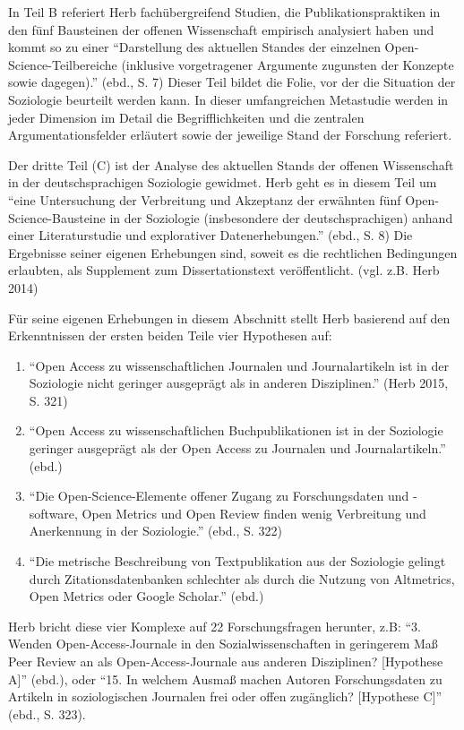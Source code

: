 \documentclass[a4paper,
fontsize=11pt,
oneside,
numbers=noperiodatend,
parskip=half-,
bibliography=totoc,
final
]{scrartcl}
\begin{document}
In Teil B referiert Herb fachübergreifend Studien, die
Publikationspraktiken in den fünf Bausteinen der offenen Wissenschaft
empirisch analysiert haben und kommt so zu einer \enquote{Darstellung
des aktuellen Standes der einzelnen Open-Science-Teilbereiche (inklusive
vorgetragener Argumente zugunsten der Konzepte sowie dagegen).} (ebd.,
S. 7) Dieser Teil bildet die Folie, vor der die Situation der Soziologie
beurteilt werden kann. In dieser umfangreichen Metastudie werden in
jeder Dimension im Detail die Begrifflichkeiten und die zentralen
Argumentationsfelder erläutert sowie der jeweilige Stand der Forschung
referiert.

Der dritte Teil (C) ist der Analyse des aktuellen Stands der offenen
Wissenschaft in der deutschsprachigen Soziologie gewidmet. Herb geht es
in diesem Teil um \enquote{eine Untersuchung der Verbreitung und
Akzeptanz der erwähnten fünf Open-Science-Bausteine in der Soziologie
(insbesondere der deutschsprachigen) anhand einer Literaturstudie und
explorativer Datenerhebungen.} (ebd., S. 8) Die Ergebnisse seiner
eigenen Erhebungen sind, soweit es die rechtlichen Bedingungen
erlaubten, als Supplement zum Dissertationstext veröffentlicht. (vgl.
z.B. Herb 2014)

Für seine eigenen Erhebungen in diesem Abschnitt stellt Herb basierend
auf den Erkenntnissen der ersten beiden Teile vier Hypothesen auf:

\begin{enumerate}
\def\labelenumi{\Alph{enumi}.}
\item
  \enquote{Open Access zu wissenschaftlichen Journalen und
  Journalartikeln ist in der Soziologie nicht geringer ausgeprägt als in
  anderen Disziplinen.} (Herb 2015, S. 321)
\item
  \enquote{Open Access zu wissenschaftlichen Buchpublikationen ist in
  der Soziologie geringer ausgeprägt als der Open Access zu Journalen
  und Journalartikeln.} (ebd.)
\item
  \enquote{Die Open-Science-Elemente offener Zugang zu Forschungsdaten
  und -software, Open Metrics und Open Review finden wenig Verbreitung
  und Anerkennung in der Soziologie.} (ebd., S. 322)
\item
  \enquote{Die metrische Beschreibung von Textpublikation aus der
  Soziologie gelingt durch Zitationsdatenbanken schlechter als durch die
  Nutzung von Altmetrics, Open Metrics oder Google Scholar.} (ebd.)
\end{enumerate}

Herb bricht diese vier Komplexe auf 22 Forschungsfragen herunter, z.B:
\enquote{3. Wenden Open-Access-Journale in den Sozialwissenschaften in
geringerem Maß Peer Review an als Open-Access-Journale aus anderen
Disziplinen? {[}Hypothese A{]}} (ebd.), oder \enquote{15. In welchem
Ausmaß machen Autoren Forschungsdaten zu Artikeln in soziologischen
Journalen frei oder offen zugänglich? {[}Hypothese C{]}} (ebd., S. 323).
\end{document}
